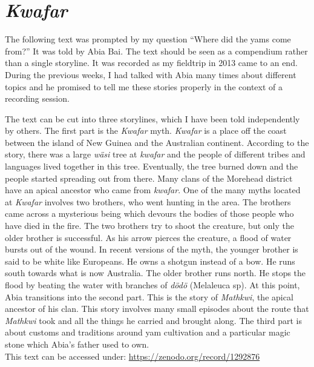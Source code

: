 
\appendix
{}

\section*{\emph{Kwafar}}\label{kwafar}

The following text was prompted by my question ``Where did the yams come from?'' It was told by Abia Bai. The text should be seen as a compendium rather than a single storyline. It was recorded as my fieldtrip in 2013 came to an end. During the previous weeks, I had talked with Abia many times about different topics and he promised to tell me these stories properly in the context of a recording session. 

The text can be cut into three storylines, which I have been told independently by others. The first part is the \emph{Kwafar} myth. \emph{Kwafar} is a place off the coast between the island of New Guinea and the Australian continent. According to the story, there was a large \emph{wäsi} tree at \emph{kwafar} and the people of different tribes and languages lived together in this tree. Eventually, the tree burned down and the people started spreading out from there. Many clans of the Morehead district have an apical ancestor who came from \emph{kwafar}. One of the many myths located at \emph{Kwafar} involves two brothers, who went hunting in the area. The brothers came across a mysterious being which devours the bodies of those people who have died in the fire. The two brothers try to shoot the creature, but only the older brother is successful. As his arrow pierces the creature, a flood of water bursts out of the wound. In recent versions of the myth, the younger brother is said to be white like Europeans. He owns a shotgun instead of a bow. He runs south towards what is now Australia. The older brother runs north. He stops the flood by beating the water with branches of \emph{dödö} (Melaleuca sp). At this point, Abia transitions into the second part. This is the story of \emph{Mathkwi}, the apical ancestor of his clan. This story involves many small episodes about the route that \emph{Mathkwi} took and all the things he carried and brought along. The third part is about customs and traditions around yam cultivation and a particular magic stone which Abia's father used to own.\\

\noindent
This text can be accessed under: \href{https://zenodo.org/record/1292876}{https://zenodo.org/record/1292876}

